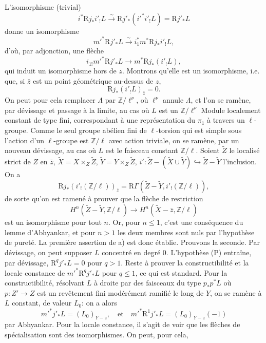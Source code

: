 L'isomorphisme (trivial)
\[
i^*\mathrm{R} j_*i'_!L\xrightarrow{\sim}\mathrm{R} j'_*(i'^*i'_!L)=\mathrm{R} j'_*L
\]
donne un
isomorphisme
\[
m'^*\mathrm{R} j'_*L\xrightarrow{\sim} i_1^*m^*\mathrm{R} j_*i'_!L,
\]
d'où, par adjonction, une flèche
\[
i_{1!}m'^*\mathrm{R} j'_*L\longrightarrow m^*\mathrm{R} j_*(i'_!L),
\]
qui induit un isomorphisme hors de $z$. Montrons qu'elle est un isomorphisme, i.e. que, si $\bar z$ est un point géométrique au-dessus de $z$,
\[
\mathrm{R} j_*(i'_!L)_{\bar z}=0.
\]
On peut pour cela remplacer $\Lambda$ par $\mathbb{Z}/\ell^\nu$, où $\ell^\nu$ annule $\Lambda$, et l'on se ramène, par dévissage et passage à la limite, au cas où $L$ est un $\mathbb{Z}/\ell^\nu$ Module localement constant de type fini, correspondant à une représentation du $\pi_1$ à travers un $\ell$-groupe. Comme le seul groupe abélien fini de $\ell$-torsion qui est simple sous l'action d'un $\ell$-groupe est $\mathbb{Z}/\ell$ avec action triviale, on se ramène, par un nouveau dévissage, au cas où $L$ est le faisceau constant $\mathbb{Z}/\ell$. Soient $\widetilde Z$ le localisé strict de $Z$ en $\bar z$, $\widetilde X=X\times_Z\widetilde Z$, $\widetilde Y=Y\times_Z\widetilde Z$, $i':\widetilde Z-(\widetilde X\cup\widetilde Y)\hookrightarrow \widetilde Z-\widetilde Y$ l'inclusion. On a
\[
\mathrm{R} j_*(i'_!(\mathbb{Z}/\ell))_{\bar z}
=\mathrm{R}\Gamma(\widetilde Z-\widetilde Y,i'_!(\mathbb{Z}/\ell)),
\]
de sorte qu'on est ramené à prouver que la flèche de restriction
\[
H^n(\widetilde Z-\widetilde Y,\mathbb{Z}/\ell)
\longrightarrow
H^n(\widetilde X-\bar z,\mathbb{Z}/\ell)
\]
est un isomorphisme pour tout $n$. Or, pour $n\le1$, c'est une conséquence du lemme d'Abhyankar, et pour $n>1$ les deux membres sont nuls par l'hypothèse de pureté. La première assertion de a) est donc établie. Prouvons la seconde. Par dévissage, on peut supposer $L$ concentré en degré $0$. L'hypothèse (P) entraîne, par dévissage, $\mathrm{R}^qj'_*L=0$ pour $q>1$. Reste à prouver la constructibilité et la locale constance de $m'^*\mathrm{R}^qj'_*L$ pour $q\le1$, ce qui est standard. Pour la constructibilité, résolvant $L$ à droite par des faisceaux du type $p_*p^*L$ où $p:Z'\to Z$ est un revêtement fini modérément ramifié le long de $Y$, on se ramène à $L$ constant, de valeur $L_0$: on a alors
\[
m'^*j'_*L=(L_0)_{Y-z},
\quad\text{et}\quad
m'^*\mathrm{R}^1j'_*L=(L_0)_{Y-z}(-1)
\]
par Abhyankar. Pour la locale constance, il s'agit de voir que les flèches de spécialisation sont des isomorphismes. On peut, pour cela,
